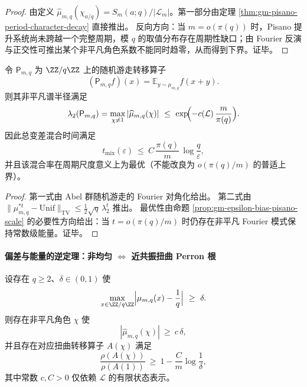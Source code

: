 \begin{proof}
由定义 \(\widehat\mu_{m,q}(\chi_{a/q})=S_m(a;q)/|\mathcal{L}_m|\)。第一部分由定理 \ref{thm:gm-pisano-period-character-decay} 直接推出。
反向方向：当 \(m=o(\pi(q))\) 时，Pisano 提升系统尚未跨越一个完整周期，模 \(q\) 的取值分布存在周期性缺口；由 Fourier 反演与正交性可推出某个非平凡角色系数不能同时趋零，从而得到下界。证毕。
\end{proof}

\begin{proposition}\label{prop:gm-random-walk-mixing-pisano}
令 \(\mathsf{P}_{m,q}\) 为 \(\ZZ/q\ZZ\) 上的随机游走转移算子
\[
(\mathsf{P}_{m,q}f)(x)=\mathbb{E}_{y\sim\mu_{m,q}}f(x+y).
\]
则其非平凡谱半径满足
\[
\lambda_2(\mathsf{P}_{m,q})=\max_{\chi\neq 1}|\widehat\mu_{m,q}(\chi)|
\ \le\ \exp\!\Bigl(-c(\mathcal{L})\,\frac{m}{\pi(q)}\Bigr).
\]
因此总变差混合时间满足
\[
t_{\mathrm{mix}}(\varepsilon)\ \le\ C\,\frac{\pi(q)}{m}\,\log\!\frac{q}{\varepsilon},
\]
并且该混合率在周期尺度意义上为最优（不能改良为 \(o(\pi(q)/m)\) 的普适上界）。
\end{proposition}

\begin{proof}
第一式由 Abel 群随机游走的 Fourier 对角化给出。
第二式由 \(\|\mu_{m,q}^{\ast t}-\mathrm{Unif}\|_{\mathrm{TV}}\le \tfrac12\sqrt{q}\,\lambda_2^t\) 推出。
最优性由命题 \ref{prop:gm-epsilon-bias-pisano-scale} 的必要性方向给出：当 \(t=o(\pi(q)/m)\) 时仍存在非平凡 Fourier 模式保持常数级能量。证毕。
\end{proof}

\paragraph{偏差与能量的逆定理：非均匀 \texorpdfstring{$\Leftrightarrow$}{<->} 近共振扭曲 Perron 根}
\begin{proposition}[模偏差的逆定理：偏差下界 \texorpdfstring{$\Rightarrow$}{=>} 近共振扭曲 Perron 根]\label{prop:gm-mod-bias-inverse-near-resonance}
设存在 \(q\ge 2\)、\(\delta\in(0,1)\) 使
\[
\max_{x\in\ZZ/q\ZZ}\Bigl|\mu_{m,q}(x)-\frac1q\Bigr|\ \ge\ \delta.
\]
则存在非平凡角色 \(\chi\) 使
\[
|\widehat\mu_{m,q}(\chi)|\ \ge\ c\,\delta,
\]
并且存在对应扭曲转移算子 \(A(\chi)\) 满足
\[
\frac{\rho(A(\chi))}{\rho(A(1))}
\ \ge\
1-\frac{C}{m}\log\!\frac{1}{\delta},
\]
其中常数 \(c,C>0\) 仅依赖 \(\mathcal{L}\) 的有限状态表示。
\end{proposition}

